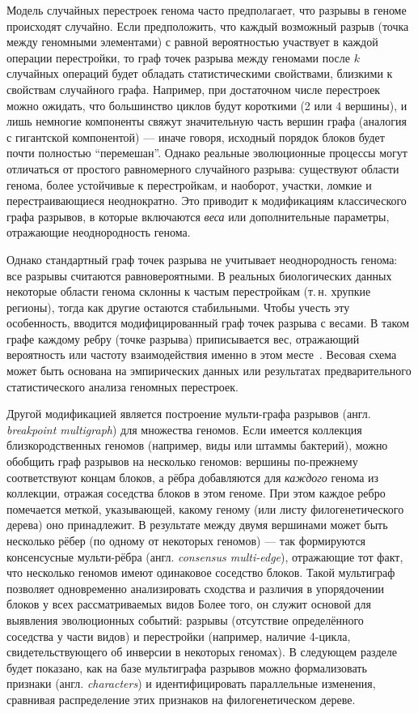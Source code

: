 Модель случайных перестроек генома часто предполагает, что разрывы в геноме происходят случайно.
Если предположить, что каждый возможный разрыв (точка между геномными элементами) с равной вероятностью участвует в каждой операции перестройки, то граф точек разрыва между геномами после $k$ случайных операций будет обладать статистическими свойствами, близкими к свойствам случайного графа.
Например, при достаточном числе перестроек можно ожидать, что большинство циклов будут короткими (2 или 4 вершины), и лишь немногие компоненты свяжут значительную часть вершин графа (аналогия с гигантской компонентой) — иначе говоря, исходный порядок блоков будет почти полностью ``перемешан''.
Однако реальные эволюционные процессы могут отличаться от простого равномерного случайного разрыва: существуют области генома, более устойчивые к перестройкам, и наоборот, участки, ломкие и перестраивающиеся неоднократно.
Это приводит к модификациям классического графа разрывов, в которые включаются \textit{веса} или дополнительные параметры, отражающие неоднородность генома.

Однако стандартный граф точек разрыва не учитывает неоднородность генома: все разрывы считаются равновероятными.
В реальных биологических данных некоторые области генома склонны к частым перестройкам (т.\,н. хрупкие регионы), тогда как другие остаются стабильными.
Чтобы учесть эту особенность, вводится модифицированный граф точек разрыва с весами.
В таком графе каждому ребру (точке разрыва) приписывается вес, отражающий вероятность или частоту взаимодействия именно в этом месте~\cite{tannier2016}.
Весовая схема может быть основана на эмпирических данных или результатах предварительного статистического анализа геномных перестроек.

Другой модификацией является построение мульти-графа разрывов (англ. \textit{breakpoint multigraph}) для множества геномов.
Если имеется коллекция близкородственных геномов (например, виды или штаммы бактерий), можно обобщить граф разрывов на несколько геномов: вершины по-прежнему соответствуют концам блоков, а рёбра добавляются для \emph{каждого} генома из коллекции, отражая соседства блоков в этом геноме.
При этом каждое ребро помечается меткой, указывающей, какому геному (или листу филогенетического дерева) оно принадлежит.
В результате между двумя вершинами может быть несколько рёбер (по одному от некоторых геномов) — так формируются консенсусные мульти-рёбра (англ. \textit{consensus multi-edge}), отражающие тот факт, что несколько геномов имеют одинаковое соседство блоков.
Такой мультиграф позволяет одновременно анализировать сходства и различия в упорядочении блоков у всех рассматриваемых видов
Более того, он служит основой для выявления эволюционных событий: разрывы (отсутствие определённого соседства у части видов) и перестройки (например, наличие 4-цикла, свидетельствующего об инверсии в некоторых геномах).
В следующем разделе будет показано, как на базе мультиграфа разрывов можно формализовать признаки (англ. \textit{characters}) и идентифицировать параллельные изменения, сравнивая распределение этих признаков на филогенетическом дереве.


